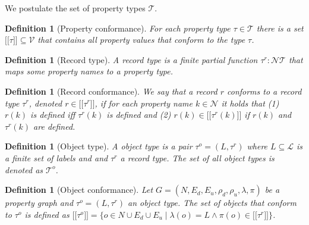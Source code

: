 \documentclass[a4paper]{article}
\makeatletter
\newtheorem{definition}[theorem]{Definition}
\newcommand{\pto}{}%
\DeclareRobustCommand{\pto}{\mathrel{\mathpalette\p@to@gets\to}}
\newcommand{\p@to@gets}[2]{%
  \ooalign{\hidewidth$\m@th#1\mapstochar\mkern5mu$\hidewidth\cr$\m@th#1\to$\cr}%
}
\newcommand{\ptype}{\tau}
\newcommand{\ptypes}{\mathcal{T}}
\newcommand{\rtype}{\tau^r}
\newcommand{\otype}{\tau^o}
\newcommand{\otypes}{\mathcal{T}^o}
\newcommand{\lsem}{\ensuremath{[\![}}
\newcommand{\rsem}{\ensuremath{]\!]}}
\newcommand{\sem}[1]{\ensuremath{\lsem #1 \rsem}}
\makeatother
\begin{document}
We postulate the set of property types $\mathcal{T}$.

\begin{definition}[Property conformance]
  For each property type $\ptype \in \ptypes$ there is a set $\sem{\ptype} \subseteq \mathcal{V}$ that contains all property values that \emph{conform} to the type $\ptype$.
\end{definition}

\begin{definition}[Record type]
  A \emph{record type} is a finite partial function $\rtype : \mathcal{N} \pto \ptypes$ that maps some property names to a property type.
\end{definition}

\begin{definition}[Record conformance]
  We say that a record $r$ \emph{conforms} to a record type $\rtype$, denoted $r \in \sem{\rtype}$, if for each property name $k \in \mathcal{N}$ it holds that (1) $r(k)$ is defined iff $\rtype(k)$ is defined and (2) $r(k) \in \sem{\rtype(k)}$ if $r(k)$ and $\rtype(k)$ are defined.
\end{definition}

\begin{definition}[Object type]
  A \emph{object type} is a pair $\otype = (L, \rtype)$ where $L \subseteq \mathcal{L}$ is a finite set of labels and and $\rtype$ a record type. 
  The set of all object types is denoted as $\otypes$.
\end{definition}

\begin{definition}[Object conformance]
  Let $G = (N, E_d, E_u, \rho_d, \rho_u, \lambda, \pi)$ be a property graph and $\otype = (L, \rtype)$ an object type. The set of objects that \emph{conform} to $\otype$ is defined as $\sem{\otype} = \{o \in N \cup E_d \cup E_u \mid \lambda(o) = L \wedge \pi(o) \in \sem{\rtype}\}$.
\end{definition}
\end{document}

